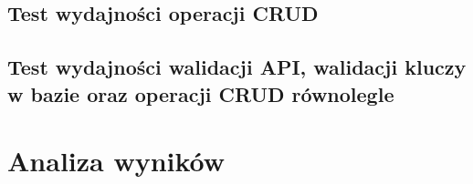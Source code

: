 \subsection{Test wydajności operacji CRUD}


\clearpage

\subsection{Test wydajności walidacji API, walidacji kluczy w bazie oraz operacji CRUD równolegle }


\clearpage

\newpage
\section{Analiza wyników}
